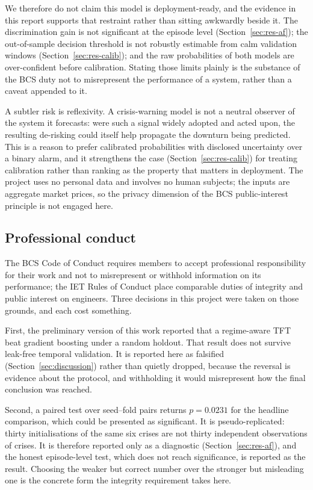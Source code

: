\documentclass[11pt,a4paper]{article}
\begin{document}
We therefore do not claim this model is deployment-ready, and the evidence in
this report supports that restraint rather than sitting awkwardly beside it.
The discrimination gain is not significant at the episode level
(Section~\ref{sec:res-af}); the out-of-sample decision threshold is not
robustly estimable from calm validation windows (Section~\ref{sec:res-calib});
and the raw probabilities of both models are over-confident before calibration.
Stating those limits plainly is the substance of the BCS duty not to
misrepresent the performance of a system, rather than a caveat appended to it.

A subtler risk is reflexivity. A crisis-warning model is not a neutral observer
of the system it forecasts: were such a signal widely adopted and acted upon,
the resulting de-risking could itself help propagate the downturn being
predicted. This is a reason to prefer calibrated probabilities with disclosed
uncertainty over a binary alarm, and it strengthens the case
(Section~\ref{sec:res-calib}) for treating calibration rather than ranking as
the property that matters in deployment. The project uses no personal data and
involves no human subjects; the inputs are aggregate market prices, so the
privacy dimension of the BCS public-interest principle is not engaged here.

\subsection{Professional conduct}
The BCS Code of Conduct requires members to accept professional responsibility
for their work and not to misrepresent or withhold information on its
performance; the IET Rules of Conduct place comparable duties of integrity and
public interest on engineers. Three decisions in this project were taken on
those grounds, and each cost something.

First, the preliminary version of this work reported that a regime-aware TFT
beat gradient boosting under a random holdout. That result does not survive
leak-free temporal validation. It is reported here as falsified
(Section~\ref{sec:discussion}) rather than quietly dropped, because the
reversal is evidence about the protocol, and withholding it would misrepresent
how the final conclusion was reached.

Second, a paired test over seed--fold pairs returns $p=0.0231$ for the headline
comparison, which could be presented as significant. It is pseudo-replicated:
thirty initialisations of the same six crises are not thirty independent
observations of crises. It is therefore reported only as a diagnostic
(Section~\ref{sec:res-af}), and the honest episode-level test, which does not
reach significance, is reported as the result. Choosing the weaker but correct
number over the stronger but misleading one is the concrete form the integrity
requirement takes here.
\end{document}
